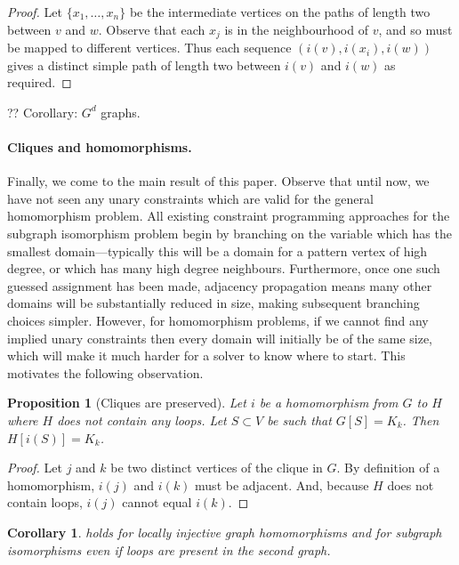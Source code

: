 \documentclass{article}
\newtheorem{proposition}{Proposition}
\newtheorem{corollary}{Corollary}
\begin{document}
\begin{proof}Let $\{ x_1, \ldots, x_n \}$ be the intermediate vertices on the paths of length two
between $v$ and $w$. Observe that each $x_j$ is in the neighbourhood of $v$, and so must be mapped
    to different vertices. Thus each sequence $(i(v), i(x_i), i(w))$ gives a distinct simple path of
length two between $i(v)$ and $i(w)$ as required.\end{proof}

?? Corollary: $G^d$ graphs.

\paragraph{Cliques and homomorphisms.} Finally, we come to the main result of this paper. Observe
that until now, we have not seen any unary constraints which are valid for the general homomorphism
problem. All existing constraint programming approaches for the subgraph isomorphism problem begin
by branching on the variable which has the smallest domain---typically this will be a domain for a
pattern vertex of high degree, or which has many high degree neighbours. Furthermore, once one such
guessed assignment has been made, adjacency propagation means many other domains will be
substantially reduced in size, making subsequent branching choices simpler.  However, for
homomorphism problems, if we cannot find any implied unary constraints then every domain will
initially be of the same size, which will make it much harder for a solver to know where to start.
This motivates the following observation.

\begin{proposition}[Cliques are preserved]\label{proposition:clique}
    Let $i$ be a homomorphism from $G$ to $H$ where $H$ does
    not contain any loops. Let $S\subset V$ be such that $G[S]=K_k$. Then $H[i(S)]=K_k$. 
\end{proposition}

\begin{proof}
    Let $j$ and $k$ be two distinct vertices of the clique in $G$. By definition of a homomorphism,
    $i(j)$ and $i(k)$ must be adjacent. And, because $H$ does not contain loops, $i(j)$ cannot equal
    $i(k)$.
\end{proof}

\begin{corollary} holds for locally injective graph homomorphisms and for
    subgraph isomorphisms even if loops are present in the second graph.
\end{corollary}
\end{document}

